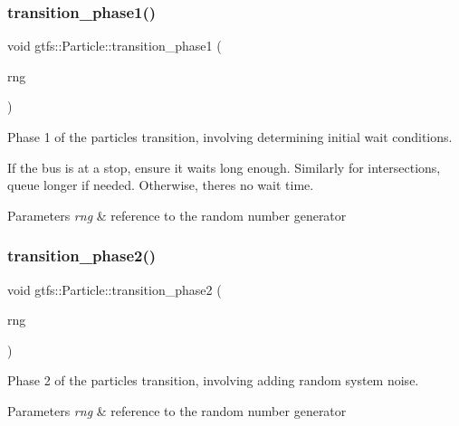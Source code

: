 \subsubsection{\texorpdfstring{transition\+\_\+phase1()}{transition\_phase1()}}
{\footnotesize\ttfamily void gtfs\+::\+Particle\+::transition\+\_\+phase1 (\begin{DoxyParamCaption}\item[{\hyperlink{classsampling_1_1RNG}{sampling\+::\+R\+NG} \&}]{rng }\end{DoxyParamCaption})}

Phase 1 of the particle\textquotesingle{}s transition, involving determining initial wait conditions.

If the bus is at a stop, ensure it waits long enough. Similarly for intersections, queue longer if needed. Otherwise, there\textquotesingle{}s no wait time.


\begin{DoxyParams}{Parameters}
{\em rng} & reference to the random number generator \\
\hline
\end{DoxyParams}
\mbox{\label{classgtfs_1_1Particle_ad9374830814c89b2d5c0af705bda8849}} 
\subsubsection{\texorpdfstring{transition\+\_\+phase2()}{transition\_phase2()}}
{\footnotesize\ttfamily void gtfs\+::\+Particle\+::transition\+\_\+phase2 (\begin{DoxyParamCaption}\item[{\hyperlink{classsampling_1_1RNG}{sampling\+::\+R\+NG} \&}]{rng }\end{DoxyParamCaption})}

Phase 2 of the particle\textquotesingle{}s transition, involving adding random system noise.


\begin{DoxyParams}{Parameters}
{\em rng} & reference to the random number generator \\
\hline
\end{DoxyParams}
\mbox{\label{classgtfs_1_1Particle_a68043b2380d8f530d648dd99e5a85101}} 
